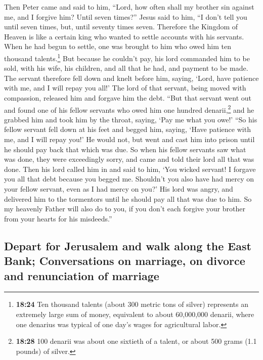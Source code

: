  Then Peter came and said to him, ``Lord, how often shall
my brother sin against me, and I forgive him? Until seven times?''
 Jesus said to him, ``I don't tell you until seven times,
but, until seventy times seven.  Therefore the Kingdom of
Heaven is like a certain king who wanted to settle accounts with his
servants.  When he had begun to settle, one was brought
to him who owed him ten thousand talents.\footnote{\textbf{18:24} Ten
  thousand talents (about 300 metric tons of silver) represents an
  extremely large sum of money, equivalent to about 60,000,000 denarii,
  where one denarius was typical of one day's wages for agricultural
  labor.}  But because he couldn't pay, his lord
commanded him to be sold, with his wife, his children, and all that he
had, and payment to be made.  The servant therefore fell
down and knelt before him, saying, `Lord, have patience with me, and I
will repay you all!'  The lord of that servant, being
moved with compassion, released him and forgave him the debt.
 ``But that servant went out and found one of his fellow
servants who owed him one hundred denarii,\footnote{\textbf{18:28} 100
  denarii was about one sixtieth of a talent, or about 500 grams (1.1
  pounds) of silver.} and he grabbed him and took him by the throat,
saying, `Pay me what you owe!'  ``So his fellow servant
fell down at his feet and begged him, saying, `Have patience with me,
and I will repay you!'  He would not, but went and cast
him into prison until he should pay back that which was due.
 So when his fellow servants saw what was done, they were
exceedingly sorry, and came and told their lord all that was done.
 Then his lord called him in and said to him, `You wicked
servant! I forgave you all that debt because you begged me.
 Shouldn't you also have had mercy on your fellow
servant, even as I had mercy on you?'  His lord was
angry, and delivered him to the tormentors until he should pay all that
was due to him.  So my heavenly Father will also do to
you, if you don't each forgive your brother from your hearts for his
misdeeds.''

\hypertarget{depart-for-jerusalem-and-walk-along-the-east-bank-conversations-on-marriage-on-divorce-and-renunciation-of-marriage}{%
\subsection{Depart for Jerusalem and walk along the East Bank;
Conversations on marriage, on divorce and renunciation of
marriage}\label{depart-for-jerusalem-and-walk-along-the-east-bank-conversations-on-marriage-on-divorce-and-renunciation-of-marriage}}

